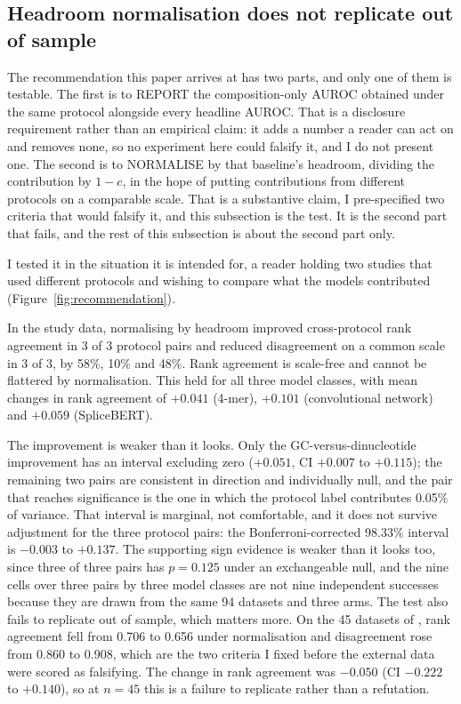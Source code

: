\subsection{Headroom normalisation does not replicate out of sample}
\label{sec:recommendation}

The recommendation this paper arrives at has two parts, and only one of them is testable. The
first is to REPORT the composition-only AUROC obtained under the same protocol alongside every
headline AUROC. That is a disclosure requirement rather than an empirical claim: it adds a
number a reader can act on and removes none, so no experiment here could falsify it, and I do
not present one. The second is to NORMALISE by that baseline's headroom, dividing the
contribution by $1-c$, in the hope of putting contributions from different protocols on a
comparable scale. That is a substantive claim, I pre-specified two criteria that would falsify
it, and this subsection is the test. It is the second part that fails, and the rest of this
subsection is about the second part only.

I tested it in the situation it is intended for, a reader holding two studies that used
different protocols and wishing to compare what the models contributed
(Figure~\ref{fig:recommendation}).

In the study data, normalising by headroom improved cross-protocol rank agreement in 3 of 3 protocol
pairs and reduced disagreement on a common scale in 3 of 3, by 58\%, 10\% and 48\%. Rank
agreement is scale-free and cannot be flattered by normalisation. This held for all three model
classes, with mean changes in rank agreement of $+0.041$ (4-mer), $+0.101$ (convolutional
network) and $+0.059$ (SpliceBERT).

The improvement is weaker than it looks. Only the GC-versus-dinucleotide improvement has an
interval excluding
zero ($+0.051$, CI $+0.007$ to $+0.115$); the remaining two pairs are consistent in direction
and individually null, and the pair that reaches significance is the one in which the protocol
label contributes 0.05\% of variance. That interval is marginal, not comfortable,
and it does not survive adjustment for the three protocol pairs: the Bonferroni-corrected
98.33\% interval is $-0.003$ to $+0.137$. The supporting sign evidence is weaker than it looks
too, since three of three pairs has $p=0.125$ under an exchangeable null, and the nine cells
over three pairs by three model classes are not nine independent successes because they are
drawn from the same 94 datasets and three arms. The test also fails to replicate out of sample,
which matters more. On the 45 datasets of \citet{horlacher2023}, rank agreement fell from 0.706
to 0.656 under normalisation and disagreement rose from 0.860 to 0.908, which are the two
criteria I fixed before the external data were scored as falsifying. The change in rank agreement was $-0.050$ (CI
$-0.222$ to $+0.140$), so at $n=45$ this is a failure to replicate rather than a refutation.

